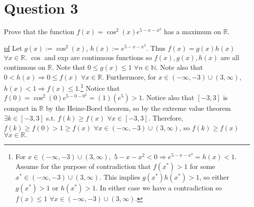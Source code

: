 \documentclass[11pt]{article} %
\begin{document}
\section{Question 3}
Prove that the function $f(x) = \cos^2 (x)e^{5-x-x^2}$ has a maximum on $\mathbb{R}$.

\underline{pf} Let $g(x):= \cos^2(x)$, $h(x):= e^{5-x-x^2}$. Thus $f(x) = g(x)h(x)$ $\forall x \in \mathbb{R}.$ $\cos$ and exp are continuous functions so $f(x),g(x),h(x)$ are all continuous on $\mathbb{R}$. Note that $0\leq g(x) \leq 1$ $\forall n \in \mathbb{N}.$ Note also that $0<h(x) \Rightarrow 0 \leq f(x) $ $\forall x \in \mathbb{R}$. Furthermore, for $x \in (-\infty,-3) \cup (3,\infty)$, $h(x) < 1 \Rightarrow f(x) \leq 1$.\footnote{For $x \in (-\infty,-3) \cup (3,\infty),$ $5-x-x^2<0 \Rightarrow e^{5 - x - x^2} = h(x) < 1.$ Assume for the purpose of contradiction that $f(x^*)>1$ for some $x^* \in (-\infty,-3) \cup (3,\infty).$ This implies $g(x^*)h(x^*) > 1$, so either $g(x^*)>1$ or $h(x^*) >1.$ In either case we have a contradiction so $f(x)\leq1$ $\forall x \in (-\infty,-3) \cup (3,\infty).$} Notice that $f(0) = \cos^2(0)e^{5 - 0 - 0^2} = (1)(e^5) > 1$. Notice also that $[-3,3]$ is compact in $\mathbb{R}$ by the Heine-Borel theorem, so by the extreme value theorem $\exists k \in [-3,3]$ s.t. $f(k) \geq f(x)$ $\forall x \in [-3,3]$. Therefore, $f(k) \geq f(0) > 1 \geq f(x)$ $\forall x \in (-\infty,-3) \cup (3,\infty)$, so $f(k) \geq f(x)$ $\forall x \in \mathbb{R}.$

\end{document}
